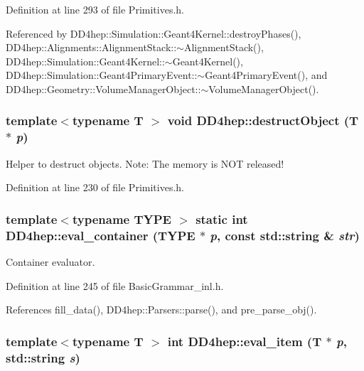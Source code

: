Definition at line 293 of file Primitives.h.

Referenced by DD4hep::Simulation::Geant4Kernel::destroyPhases(), DD4hep::Alignments::AlignmentStack::$\sim$AlignmentStack(), DD4hep::Simulation::Geant4Kernel::$\sim$Geant4Kernel(), DD4hep::Simulation::Geant4PrimaryEvent::$\sim$Geant4PrimaryEvent(), and DD4hep::Geometry::VolumeManagerObject::$\sim$VolumeManagerObject().\hypertarget{namespace_d_d4hep_ade831af9bcee15f0635c098a5c1a9da4}{
\subsubsection[{destructObject}]{\setlength{\rightskip}{0pt plus 5cm}template$<$typename T $>$ void DD4hep::destructObject ({\bf T} $\ast$ {\em p})}}
\label{namespace_d_d4hep_ade831af9bcee15f0635c098a5c1a9da4}


Helper to destruct objects. Note: The memory is NOT released! 

Definition at line 230 of file Primitives.h.\hypertarget{namespace_d_d4hep_a1faf602c462479bb19dd4ff8e494f956}{
\subsubsection[{eval\_\-container}]{\setlength{\rightskip}{0pt plus 5cm}template$<$typename TYPE $>$ static int DD4hep::eval\_\-container (TYPE $\ast$ {\em p}, \/  const std::string \& {\em str})}}
\label{namespace_d_d4hep_a1faf602c462479bb19dd4ff8e494f956}


Container evaluator. 

Definition at line 245 of file BasicGrammar\_\-inl.h.

References fill\_\-data(), DD4hep::Parsers::parse(), and pre\_\-parse\_\-obj().\hypertarget{namespace_d_d4hep_aecac9339448aa9852e98f52ba18a5ce2}{
\subsubsection[{eval\_\-item}]{\setlength{\rightskip}{0pt plus 5cm}template$<$typename T $>$ int DD4hep::eval\_\-item ({\bf T} $\ast$ {\em p}, \/  std::string {\em s})}}
\label{namespace_d_d4hep_aecac9339448aa9852e98f52ba18a5ce2}


